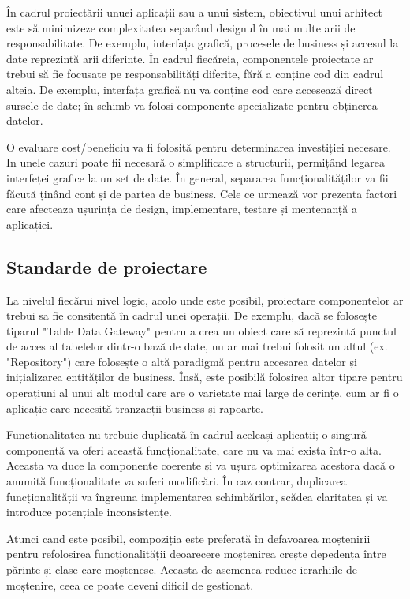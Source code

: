 \documentclass[12pt, a4paper, oneside, romanian]{teza-upb}
\begin{document}
În cadrul proiectării unuei aplicații sau a unui sistem, obiectivul unui arhitect este să minimizeze complexitatea separând designul în mai multe arii de responsabilitate. De exemplu, interfața grafică, procesele de business și accesul la date reprezintă arii diferinte. În cadrul fiecăreia, componentele proiectate ar trebui să fie focusate pe responsabilități diferite, fără a conține cod din cadrul alteia. De exemplu, interfața grafică nu va conține cod care accesează direct sursele de date; în schimb va folosi componente specializate pentru obținerea datelor. 

O evaluare cost/beneficiu va fi folosită pentru determinarea investiției necesare. In unele cazuri poate fii necesară o simplificare a structurii, permițând legarea interfeței grafice la un set de date. În general, separarea funcționalităților va fii făcută ținând cont și de partea de business. Cele ce urmează vor prezenta factori care afecteaza ușurința de design, implementare, testare și mentenanță a aplicației.

\newpage
\subsection{Standarde de proiectare}

La nivelul fiecărui nivel logic, acolo unde este posibil, proiectare componentelor ar trebui sa fie consitentă în cadrul unei operații. De exemplu, dacă se folosește tiparul "Table Data Gateway" pentru a crea un obiect care să reprezintă punctul de acces al tabelelor dintr-o bază de date, nu ar mai trebui folosit un altul (ex. "Repository") care folosește o altă paradigmă pentru accesarea datelor și inițializarea entităților de business. Însă, este posibilă folosirea altor tipare pentru operațiuni al unui alt modul care are o varietate mai large de cerințe, cum ar fi o aplicație care necesită tranzacții  business și rapoarte.

Funcționalitatea nu trebuie duplicată în cadrul aceleași aplicații; o singură componentă va oferi această funcționalitate, care nu va mai exista într-o alta. Aceasta va duce la componente coerente și va ușura optimizarea acestora dacă o anumită funcționalitate va suferi modificări. În caz contrar, duplicarea funcționalității va îngreuna implementarea schimbărilor, scădea claritatea și va introduce potențiale inconsistențe.

Atunci cand este posibil, compoziția este preferată în defavoarea moștenirii pentru refolosirea funcționalității deoarecere moștenirea crește depedența între părinte și clase care moștenesc. Aceasta de asemenea reduce ierarhiile de moștenire, ceea ce poate deveni dificil de gestionat.
\end{document}
